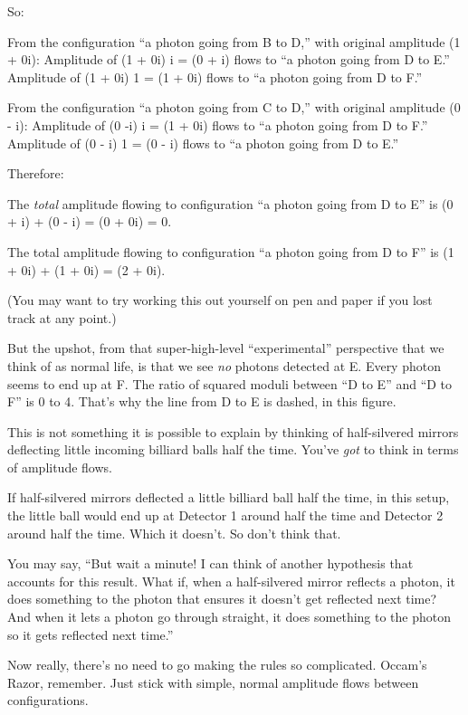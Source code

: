 {
 So:}

{
 From the configuration ``a photon going from B to
D,'' with original amplitude (1 + 0i): Amplitude of
(1 + 0i) {\texttimes} i = (0 + i) flows to ``a photon
going from D to E.'' Amplitude of (1 + 0i)
{\texttimes} 1 = (1 + 0i) flows to ``a photon going
from D to F.'' }

{
 From the configuration ``a photon going from C to
D,'' with original amplitude (0 - i): Amplitude of (0
-i) {\texttimes} i = (1 + 0i) flows to ``a photon
going from D to F.'' Amplitude of (0 - i)
{\texttimes} 1 = (0 - i) flows to ``a photon going
from D to E.'' }

{
 Therefore:}

{
 The \textit{total} amplitude flowing to configuration
``a photon going from D to E'' is (0
+ i) + (0 - i) = (0 + 0i) = 0.}

{
 The total amplitude flowing to configuration ``a
photon going from D to F'' is (1 + 0i) + (1 + 0i) =
(2 + 0i).}

{
 (You may want to try working this out yourself on pen and paper if
you lost track at any point.)}

{
 But the upshot, from that super-high-level
``experimental'' perspective that we
think of as normal life, is that we see \textit{no} photons detected at
E. Every photon seems to end up at F. The ratio of squared moduli
between ``D to E'' and
``D to F'' is 0 to 4.
That's why the line from D to E is dashed, in this
figure.}

{
 This is not something it is possible to explain by thinking of
half-silvered mirrors deflecting little incoming billiard balls half
the time. You've \textit{got} to think in terms of
amplitude flows.}

{
 If half-silvered mirrors deflected a little billiard ball half the
time, in this setup, the little ball would end up at Detector 1 around
half the time and Detector 2 around half the time. Which it
doesn't. So don't think that.}

{
 You may say, ``But wait a minute! I can think of
another hypothesis that accounts for this result. What if, when a
half-silvered mirror reflects a photon, it does something to the photon
that ensures it doesn't get reflected next time? And
when it lets a photon go through straight, it does something to the
photon so it gets reflected next time.''}

{
 Now really, there's no need to go making the rules
so complicated. Occam's Razor, remember. Just stick
with simple, normal amplitude flows between configurations.}

